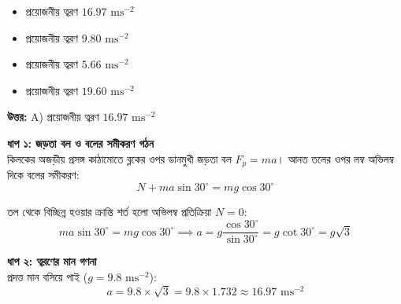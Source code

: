\documentclass[12pt, a4paper]{article}
\begin{document}
\begin{itemize}[label={}, leftmargin=1cm, itemsep=0.5em]
    \item[\textbf{A)}] প্রয়োজনীয় ত্বরণ $16.97\text{ ms}^{-2}$
    \item[\textbf{B)}] প্রয়োজনীয় ত্বরণ $9.80\text{ ms}^{-2}$
    \item[\textbf{C)}] প্রয়োজনীয় ত্বরণ $5.66\text{ ms}^{-2}$
    \item[\textbf{D)}] প্রয়োজনীয় ত্বরণ $19.60\text{ ms}^{-2}$
\end{itemize}

\vspace{0.5em}
\begin{tcolorbox}[answerbox]
    \textbf{\color{success} উত্তর:} A) প্রয়োজনীয় ত্বরণ $16.97\text{ ms}^{-2}$
\end{tcolorbox}
\vspace{1em}

\begin{tcolorbox}[solutionbox={সমাধান (Solution)}]
    \noindent
    \textbf{ধাপ ১: জড়তা বল ও বলের সমীকরণ গঠন} \\
    কিলকের অজড়ীয় প্রসঙ্গ কাঠামোতে ব্লকের ওপর ডানমুখী জড়তা বল $F_p = m a$। আনত তলের ওপর লম্ব অভিলম্ব দিকে বলের সমীকরণ:
    \[ N + m a \sin 30^\circ = m g \cos 30^\circ \]
    
    তল থেকে বিচ্ছিন্ন হওয়ার ক্রান্তি শর্ত হলো অভিলম্ব প্রতিক্রিয়া $N = 0$:
    \[ m a \sin 30^\circ = m g \cos 30^\circ \implies a = g \frac{\cos 30^\circ}{\sin 30^\circ} = g \cot 30^\circ = g \sqrt{3} \]
    
    \vspace{0.5em}
    \noindent\textbf{ধাপ ২: ত্বরণের মান গণনা} \\
    প্রদত্ত মান বসিয়ে পাই ($g = 9.8\text{ ms}^{-2}$):
    \[ a = 9.8 \times \sqrt{3} = 9.8 \times 1.732 \approx \mathbf{16.97}\text{ ms}^{-2} \]
\end{tcolorbox}

\newpage
\end{document}

